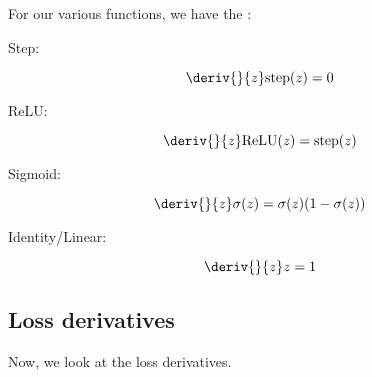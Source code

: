         
        \begin{notation}
            For our various  functions, we have the :
            
            Step:
            
            \begin{equation*}
                \deriv{}{z} \text{step}(z) = 0
            \end{equation*}
            
            ReLU:
            
            \begin{equation*}
                \deriv{}{z} \text{ReLU}(z) = \text{step}(z)
            \end{equation*}
            
            Sigmoid:
            
            \begin{equation*}
                \deriv{}{z}\sigma(z) 
                =
                \sigma(z)(1-\sigma(z))
            \end{equation*}
            
            Identity/Linear:
            
            \begin{equation*}
                \deriv{}{z} z 
                =
                1
            \end{equation*}
        \end{notation}
        
    \secdiv
    
    \subsection*{Loss derivatives}
    
        Now, we look at the loss derivatives.
        
